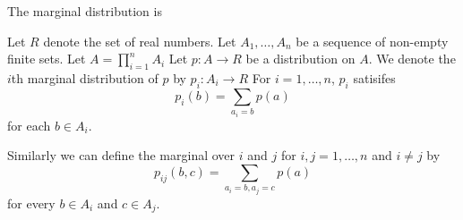 
\sbasic















\sstart
{}



The marginal distribution is


Let $R$ denote the set of
real numbers.
Let $A_1, \dots, A_n$ be
a sequence of non-empty finite
sets.
Let $A = \prod_{i = 1}^{n} A_i$
Let $p: A \to R$ be a distribution
on $A$.
We denote the $i$th marginal
distribution of $p$ by $p_i: A_i \to R$
For $i = 1, \dots, n$,
$p_i$ satisifes
\[
  p_i(b) = \sum_{a_i = b} p(a)
\]
for each $b \in A_i$.

Similarly we can define the
marginal over $i$ and $j$
for $i, j = 1, \dots, n$
and $i \neq j$ by
\[
  p_{ij}(b, c) = \sum_{a_i = b, a_j = c} p(a)
\]
for every $b \in A_i$ and $c \in A_j$.
\strats
